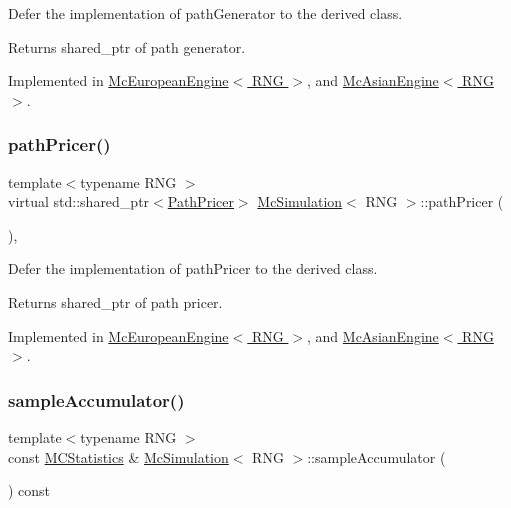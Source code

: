 Defer the implementation of path\+Generator to the derived class. 

\begin{DoxyReturn}{Returns}
shared\+\_\+ptr of path generator. 
\end{DoxyReturn}


Implemented in \hyperlink{class_mc_european_engine_af3bd77fe30b60833448ee44efe6280d9}{Mc\+European\+Engine$<$ R\+N\+G $>$}, and \hyperlink{class_mc_asian_engine_ae38592c71ae4d5d09c9eb13d7cc0c5ff}{Mc\+Asian\+Engine$<$ R\+N\+G $>$}.

\hypertarget{class_mc_simulation_ae3b894a78823df7897abf418bb04a4a1}{}\label{class_mc_simulation_ae3b894a78823df7897abf418bb04a4a1} 
\subsubsection{\texorpdfstring{path\+Pricer()}{pathPricer()}}
{\footnotesize\ttfamily template$<$typename R\+NG $>$ \\
virtual std\+::shared\+\_\+ptr$<$\hyperlink{class_path_pricer}{Path\+Pricer}$>$ \hyperlink{class_mc_simulation}{Mc\+Simulation}$<$ R\+NG $>$\+::path\+Pricer (\begin{DoxyParamCaption}{ }\end{DoxyParamCaption})\hspace{0.3cm}{\ttfamily [private]}, {}}



Defer the implementation of path\+Pricer to the derived class. 

\begin{DoxyReturn}{Returns}
shared\+\_\+ptr of path pricer. 
\end{DoxyReturn}


Implemented in \hyperlink{class_mc_european_engine_aa504b56142c757d49cc4c9e079682f6d}{Mc\+European\+Engine$<$ R\+N\+G $>$}, and \hyperlink{class_mc_asian_engine_a5b7351c28b68878b7f6d130eef293d6c}{Mc\+Asian\+Engine$<$ R\+N\+G $>$}.

\hypertarget{class_mc_simulation_ae806933e305840081ef1554ad17012c3}{}\label{class_mc_simulation_ae806933e305840081ef1554ad17012c3} 
\subsubsection{\texorpdfstring{sample\+Accumulator()}{sampleAccumulator()}}
{\footnotesize\ttfamily template$<$typename R\+NG $>$ \\
const \hyperlink{class_m_c_statistics}{M\+C\+Statistics} \& \hyperlink{class_mc_simulation}{Mc\+Simulation}$<$ R\+NG $>$\+::sample\+Accumulator (\begin{DoxyParamCaption}{ }\end{DoxyParamCaption}) const\hspace{0.3cm}{\ttfamily [protected]}}



